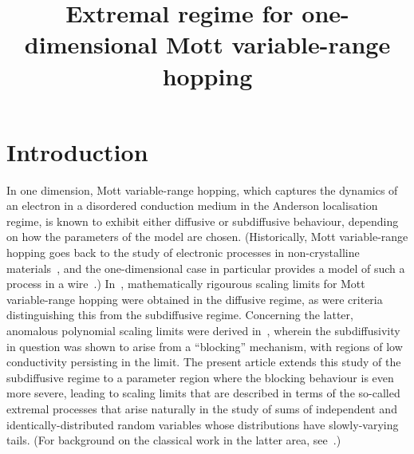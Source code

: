 \documentclass[AHL,Unicode,longabstracts,published]{cedram}
\title{Extremal regime for one-dimensional Mott variable-range hopping}
\author[\initial{D. A.} \lastname{Croydon}]{\firstname{David A.} \lastname{Croydon}}
\author[\initial{R.} \lastname{Fukushima}]{\firstname{Ryoki} \lastname{Fukushima}}
\author[\initial{S.} \lastname{Junk}]{\firstname{Stefan} \lastname{Junk}}
\begin{document}
\maketitle

\section{Introduction}\label{sec:intro}

In one dimension, Mott variable-range hopping, which captures the dynamics of an electron in a disordered conduction medium in the Anderson localisation regime, is known to exhibit either diffusive or subdiffusive behaviour, depending on how the parameters of the model are chosen. (Historically, Mott variable-range hopping goes back to the study of electronic processes in non-crystalline materials~\cite{Mott1, Mott2}, and the one-dimensional case in particular provides a model of such a process in a wire~\cite{Alex, Lee, Serota, Star}.) In~\cite{CF}, mathematically rigourous scaling limits for Mott variable-range hopping were obtained in the diffusive regime, as were criteria distinguishing this from the subdiffusive regime. Concerning the latter, anomalous polynomial scaling limits were derived in~\cite{CFJ}, wherein the subdiffusivity in question was shown to arise from a ``blocking'' mechanism, with regions of low conductivity persisting in the limit. The present article extends this study of the subdiffusive regime to a parameter region where the blocking behaviour is even more severe, leading to scaling limits that are described in terms of the so-called extremal processes that arise naturally in the study of sums of independent and identically-distributed random variables whose distributions have slowly-varying tails. (For background on the classical work in the latter area, see~\cite{Gnedenko, Lamperti, Res87}.)
\end{document}
